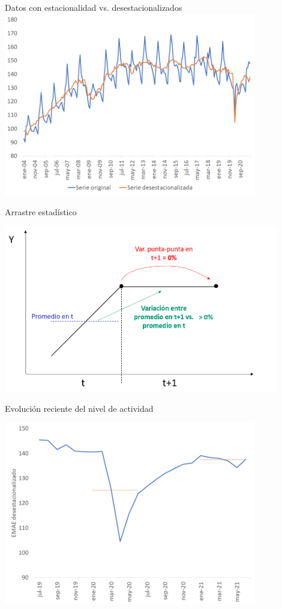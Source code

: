 \documentclass{beamer}
\begin{document}
\begin{frame}{Datos con estacionalidad vs. desestacionalizados}
\centering\includegraphics[width=11cm]{Figures/G11.png}\
\end{frame}


\begin{frame}{Arrastre estadístico}

\centering\includegraphics[width=12cm]{Figures/P11.png}\

\end{frame}


\begin{frame}{Evolución reciente del nivel de actividad}

\centering\includegraphics[width=11cm]{Figures/G12.png}\

\end{frame}
\end{document}

